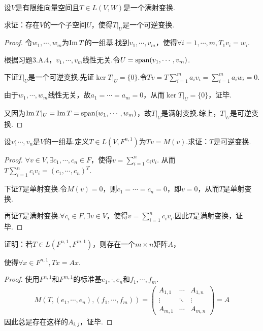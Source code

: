 \newpage

\begin{problem}[8]\label{3.D.8}
    设\(V\)是有限维向量空间且\(T \in L(V,W)\)是一个满射变换.

    求证：存在\(V\)的一个子空间\(U\)，使得\(T|_U\)是一个可逆变换.    
\end{problem}

\begin{proof}
    令\(w_1,\cdots,w_m\)为\(\operatorname{Im} T\)的一组基.找到\(v_1,\cdots,v_m\)，使得\(\forall i=1,\cdots,m,T_1v_i=w_i\).

    根据习题3.A.4，\(v_1,\cdots,v_m\)线性无关.令\(U=\operatorname{span} (v_1,\cdots,v_m)\).
    
    下证\(T|_U\)是一个可逆变换.先证\(\ker T|_U=\{0\}\).令\(Tv=T\sum_{i=1}^m a_iv_i=\sum_{i=1}^m a_iw_i=0\).
    
    由于\(w_1,\cdots,w_m\)线性无关，故\(a_1=\cdots=a_m=0\)，从而\(\ker T|_U=\{0\}\)，证毕.
    
    又因为\(\operatorname{Im} T|_U=\operatorname{Im} T=\operatorname{span} (w_1,\cdots,w_m)\)，故\(T|_U\)是满射变换.综上，\(T|_U\)是可逆变换.
\end{proof}

\begin{problem}[14]
    设\(v_1^,\cdots,v_n\)是\(V\)的一组基.定义\(T \in L(V,F^{n,1})\)为\(Tv=M(v)\).求证：\(T\)是可逆变换.    
\end{problem}

\begin{proof}
    \(\forall v \in V,\exists c_1,\cdots,c_n \in F\)，使得\(v=\sum_{i=1}^n c_iv_i\).
    从而\(T\sum_{i=1}^n c_iv_i=(c_1,\cdots,c_n)^T\).

    下证\(T\)是单射变换.令\(M(v)=0\)，则\(c_1=\cdots=c_n=0\)，即\(v=0\)，从而\(T\)是单射变换.

    再证\(T\)是满射变换.\(\forall c_i \in F,\exists v \in V\)，使得\(v=\sum_{i=1}^n c_iv_i\).因此\(T\)是满射变换，证毕.
\end{proof}

\begin{problem}[15]\label{3.D.15}
    证明：若\(T \in L(F^{n,1},F^{m,1})\)，则存在一个\(m \times n\)矩阵\(A\)，
    
    使得\(\forall x \in F^{n,1},Tx=Ax\).
\end{problem}

\begin{proof}
    使用\(F^{n,1}\)和\(F^{m,1}\)的标准基\(e_1,\cdot,e_n\)和\(f_1,\cdots,f_m\).
    \begin{align*}
        M(T,(e_1,\cdots,e_n),(f_1,\cdots,f_m))=
            \begin{pmatrix}
                A_{1,1} & \cdots & A_{1,n}  \\
                \vdots  & \ddots & \vdots   \\
                A_{m,1} & \cdots & A_{m,n}
            \end{pmatrix}
        =A
    \end{align*}
    因此总是存在这样的\(A_{i,j}\)，证毕.
\end{proof}

